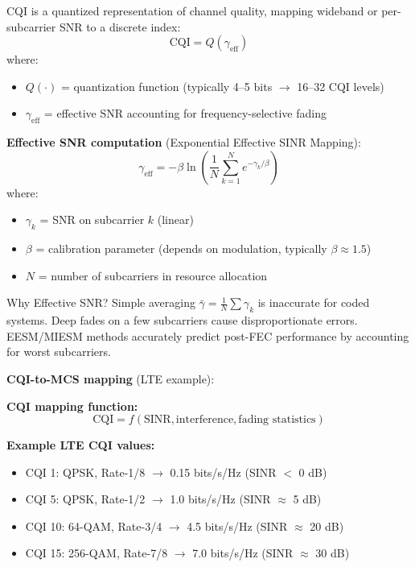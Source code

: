 CQI is a quantized representation of channel quality, mapping wideband or per-subcarrier SNR to a discrete index:
\begin{equation}
\text{CQI} = Q(\gamma_{\text{eff}})
\end{equation}
where:
\begin{itemize}
\item $Q(\cdot)$ = quantization function (typically 4--5 bits $\rightarrow$ 16--32 CQI levels)
\item $\gamma_{\text{eff}}$ = effective SNR accounting for frequency-selective fading
\end{itemize}

\textbf{Effective SNR computation} (Exponential Effective SINR Mapping):
\begin{equation}
\gamma_{\text{eff}} = -\beta \ln\left(\frac{1}{N}\sum_{k=1}^{N} e^{-\gamma_k/\beta}\right)
\end{equation}
where:
\begin{itemize}
\item $\gamma_k$ = SNR on subcarrier $k$ (linear)
\item $\beta$ = calibration parameter (depends on modulation, typically $\beta \approx 1.5$)
\item $N$ = number of subcarriers in resource allocation
\end{itemize}

\begin{calloutbox}{Why Effective SNR?}
Simple averaging $\bar{\gamma} = \frac{1}{N}\sum \gamma_k$ is inaccurate for coded systems. Deep fades on a few subcarriers cause disproportionate errors. EESM/MIESM methods accurately predict post-FEC performance by accounting for worst subcarriers.
\end{calloutbox}

\textbf{CQI-to-MCS mapping} (LTE example):

\textbf{CQI mapping function:}
\begin{equation*}
\text{CQI} = f(\text{SINR}, \text{interference}, \text{fading statistics})
\end{equation*}

\textbf{Example LTE CQI values:}
\begin{itemize}
\item CQI 1: QPSK, Rate-1/8 $\rightarrow$ 0.15 bits/s/Hz (SINR $<$ 0 dB)
\item CQI 5: QPSK, Rate-1/2 $\rightarrow$ 1.0 bits/s/Hz (SINR $\approx$ 5 dB)
\item CQI 10: 64-QAM, Rate-3/4 $\rightarrow$ 4.5 bits/s/Hz (SINR $\approx$ 20 dB)
\item CQI 15: 256-QAM, Rate-7/8 $\rightarrow$ 7.0 bits/s/Hz (SINR $\approx$ 30 dB)
\end{itemize}

